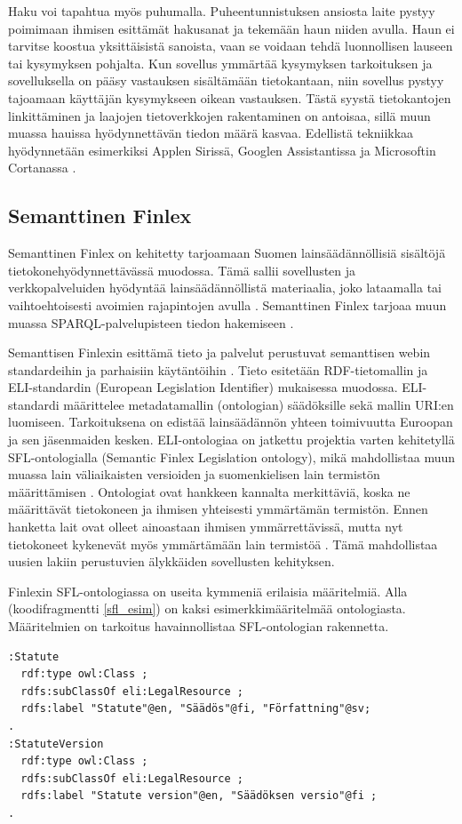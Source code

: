 \documentclass[finnish, 12pt, a4paper, elec, utf8, pdfa, online]{aaltothesis}
\begin{document}
{Haku voi tapahtua myös puhumalla. Puheentunnistuksen ansiosta laite pystyy poimimaan ihmisen esittämät hakusanat ja tekemään haun niiden avulla. Haun ei tarvitse koostua yksittäisistä sanoista, vaan se voidaan tehdä luonnollisen lauseen tai kysymyksen pohjalta. Kun sovellus ymmärtää kysymyksen tarkoituksen ja sovelluksella on pääsy vastauksen sisältämään tietokantaan, niin sovellus pystyy tajoamaan käyttäjän kysymykseen oikean vastauksen. Tästä syystä tietokantojen linkittäminen ja laajojen tietoverkkojen rakentaminen on antoisaa, sillä muun muassa hauissa hyödynnettävän tiedon määrä kasvaa. Edellistä tekniikkaa hyödynnetään esimerkiksi Applen Sirissä, Googlen Assistantissa ja Microsoftin Cortanassa \cite{siri} \cite{assistant} \cite{cortana}.

\subsection{Semanttinen Finlex}
Semanttinen Finlex on kehitetty tarjoamaan Suomen lainsäädännöllisiä sisältöjä tietokonehyödynnettävässä muodossa. Tämä sallii sovellusten ja verkkopalveluiden hyödyntää lainsäädännöllistä materiaalia, joko lataamalla tai vaihtoehtoisesti avoimien rajapintojen avulla \cite{finlex}. Semanttinen Finlex tarjoaa muun muassa SPARQL-palvelupisteen tiedon hakemiseen \cite{finlex2}.

Semanttisen Finlexin esittämä tieto ja palvelut perustuvat semanttisen webin standardeihin ja parhaisiin käytäntöihin \cite{finlex2}. Tieto esitetään RDF-tietomallin ja ELI-standardin (European Legislation Identifier) mukaisessa muodossa. ELI-standardi määrittelee metadatamallin (ontologian) säädöksille sekä mallin URI:en luomiseen. Tarkoituksena on edistää lainsäädännön yhteen toimivuutta Euroopan ja sen jäsenmaiden kesken. ELI-ontologiaa on jatkettu projektia varten kehitetyllä SFL-ontologialla (Semantic Finlex Legislation ontology), mikä mahdollistaa muun muassa lain väliaikaisten versioiden ja suomenkielisen lain termistön määrittämisen \cite{finlex3}. Ontologiat ovat hankkeen kannalta merkittäviä, koska ne määrittävät tietokoneen ja ihmisen yhteisesti ymmärtämän termistön. Ennen hanketta lait ovat olleet ainoastaan ihmisen ymmärrettävissä, mutta nyt tietokoneet kykenevät myös ymmärtämään lain termistöä \cite{finlex}. Tämä mahdollistaa uusien lakiin perustuvien älykkäiden sovellusten kehityksen.

Finlexin SFL-ontologiassa on useita kymmeniä erilaisia määritelmiä. Alla (koodifragmentti \ref{sfl_esim}) on kaksi esimerkkimääritelmää ontologiasta. Määritelmien on tarkoitus havainnollistaa SFL-ontologian rakennetta.
\vskip 0.5cm
\begin{lstlisting}[style=codeblock,caption={SFL-ontologia esimerkki.},captionpos=b,label={sfl_esim}]
:Statute
  rdf:type owl:Class ;
  rdfs:subClassOf eli:LegalResource ;
  rdfs:label "Statute"@en, "Säädös"@fi, "Författning"@sv;
.
:StatuteVersion
  rdf:type owl:Class ;
  rdfs:subClassOf eli:LegalResource ;
  rdfs:label "Statute version"@en, "Säädöksen versio"@fi ;
.
\end{lstlisting}



}
\end{document}
